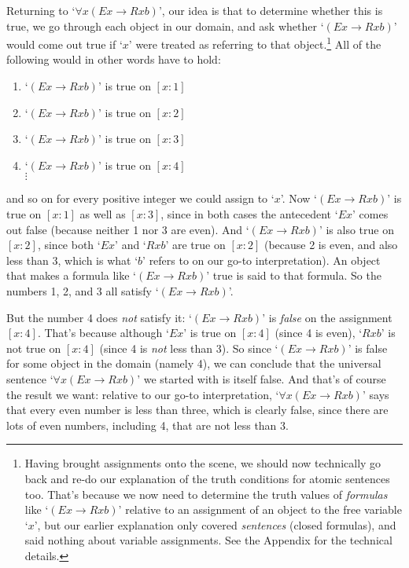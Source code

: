 Returning to `$\forall x(Ex \rightarrow Rxb)$', our idea is that to determine whether this is true, we go through each object in our domain, and ask whether `$(Ex \rightarrow Rxb)$' would come out true if `$x$' were treated as referring to that object.\footnote{Having brought assignments onto the scene, we should now technically go back and re-do our explanation of the truth conditions for atomic sentences too.  That's because we now need to determine the truth values of \emph{formulas} like `$(Ex \rightarrow Rxb)$' relative to an assignment of an object to the free variable `$x$', but our earlier explanation only covered \emph{sentences} (closed formulas), and said nothing about variable assignments.  See the Appendix for the technical details.}
All of the following would in other words have to hold:
\begin{enumerate}
\item[] `$(Ex \rightarrow Rxb)$' is true on $[x:1]$
\item[] `$(Ex \rightarrow Rxb)$' is true on $[x:2]$
\item[] `$(Ex \rightarrow Rxb)$' is true on $[x:3]$
\item[] `$(Ex \rightarrow Rxb)$' is true on $[x:4]$\\
$\vdots$
\end{enumerate}
and so on for every positive integer we could assign to `$x$'.  Now `$(Ex \rightarrow Rxb)$' is true on $[x:1]$ as well as $[x:3]$, since in both cases the antecedent `$Ex$' comes out false (because neither 1 nor 3 are even). And `$(Ex \rightarrow Rxb)$' is also true on $[x:2]$, since both `$Ex$' and `$Rxb$' are true on $[x:2]$ (because 2 is even, and also less than 3, which is what `$b$' refers to on our go-to interpretation).  An object that makes a formula like `$(Ex \rightarrow Rxb)$' true is said to  that formula.  So the numbers 1, 2, and 3 all satisfy `$(Ex \rightarrow Rxb)$'.

But the number 4 does \emph{not} satisfy it: `$(Ex \rightarrow Rxb)$' is \emph{false} on the assignment $[x:4]$.  That's because although `$Ex$' is true on $[x:4]$ (since 4 is even), `$Rxb$' is not true on $[x:4]$ (since 4 is \emph{not} less than 3).  So  since `$(Ex \rightarrow Rxb)$' is false for some object in the domain (namely 4), we can conclude that the universal sentence `$\forall x(Ex \rightarrow Rxb)$' we started with is itself false.  And that's of course the result we want: relative to our go-to interpretation, `$\forall x(Ex \rightarrow Rxb)$' says that every even number is less than three, which is clearly false, since there are lots of even numbers, including 4, that are not less than 3.

